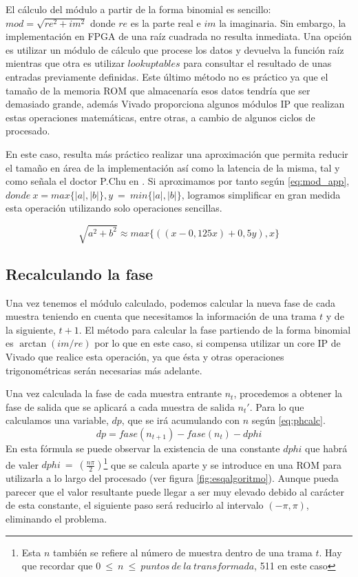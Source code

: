 El cálculo del módulo a partir de la forma binomial es sencillo: $mod = \sqrt{re^{2}+im^{2}}$ donde $re$ es la parte real e $im$ la imaginaria. Sin embargo, la implementación en FPGA de una raíz cuadrada no resulta inmediata. Una opción es utilizar un módulo de cálculo que procese los datos y devuelva la función raíz mientras que otra es utilizar $lookup tables$ para consultar el resultado de unas entradas previamente definidas. Este último método no es práctico ya que el tamaño de la memoria ROM que almacenaría esos datos tendría que ser demasiado grande, además Vivado proporciona algunos módulos IP que realizan estas operaciones matemáticas, entre otras, a cambio de algunos ciclos de procesado.

En este caso, resulta más práctico realizar una aproximación que permita reducir el tamaño en área de la implementación así como la latencia de la misma, tal y como señala el doctor P.Chu en \cite{vhdlchu}. Si aproximamos por tanto según \ref{eq:mod_app}, $donde~x = max\{|a|,|b|\}, y~=~min\{|a|,|b|\}$, logramos simplificar en gran medida esta operación utilizando solo operaciones sencillas.

\begin{equation}
\label{eq:mod_app}
 \sqrt{a^{2}+b^{2}} \approx max\{((x - 0,125x) + 0,5y),x\}
\end{equation} 

\subsection{Recalculando la fase}
Una vez tenemos el módulo calculado, podemos calcular la nueva fase de cada muestra teniendo en cuenta que necesitamos la información de una trama $t$ y de la siguiente, $t+1$. El método para calcular la fase partiendo de la forma binomial es $\arctan(im/re)$ por lo que en este caso, si compensa utilizar un core IP de Vivado que realice esta operación, ya que ésta y otras operaciones trigonométricas serán necesarias más adelante.

Una vez calculada la fase de cada muestra entrante $n_{t}$, procedemos a obtener la fase de salida que se aplicará a cada muestra de salida $n_{t}'$. Para lo que calculamos una variable, $dp$, que se irá acumulando con $n$ según \ref{eq:phcalc}. 
\begin{equation}
\label{eq:phcalc}
dp = fase(n_{t+1}) - fase(n_{t}) - dphi
\end{equation} 
En esta fórmula se puede observar la existencia de una constante $dphi$ que habrá de valer $dphi~=~(\frac{n\pi}{2})$\footnote{Esta $n$ también se refiere al número de muestra dentro de una trama $t$. Hay que recordar que $0~\leq~n~\leq~puntos~de~la~transformada$, 511 en este caso} que se calcula aparte y se introduce en una ROM para utilizarla a lo largo del procesado (ver figura \ref{fig:esqalgoritmo}). Aunque pueda parecer que el valor resultante puede llegar a ser muy elevado debido al carácter de esta constante, el siguiente paso será reducirlo al intervalo $(-\pi,\pi)$, eliminando el problema.

